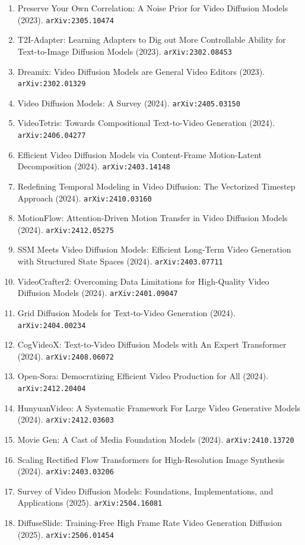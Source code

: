 \documentclass[11pt]{article}
\begin{document}
\begin{enumerate}
  \item Preserve Your Own Correlation: A Noise Prior for Video Diffusion Models (2023). \texttt{arXiv:2305.10474}
  \item T2I-Adapter: Learning Adapters to Dig out More Controllable Ability for
  Text-to-Image Diffusion Models (2023). \texttt{arXiv:2302.08453}
  \item Dreamix: Video Diffusion Models are General Video Editors (2023). \texttt{arXiv:2302.01329}
  \item Video Diffusion Models: A Survey (2024). \texttt{arXiv:2405.03150}
  \item VideoTetris: Towards Compositional Text-to-Video Generation (2024). \texttt{arXiv:2406.04277}
  \item Efficient Video Diffusion Models via Content-Frame Motion-Latent
  Decomposition (2024). \texttt{arXiv:2403.14148}
  \item Redefining Temporal Modeling in Video Diffusion: The Vectorized Timestep
  Approach (2024). \texttt{arXiv:2410.03160}
  \item MotionFlow: Attention-Driven Motion Transfer in Video Diffusion Models (2024). \texttt{arXiv:2412.05275}
  \item SSM Meets Video Diffusion Models: Efficient Long-Term Video Generation
  with Structured State Spaces (2024). \texttt{arXiv:2403.07711}
  \item VideoCrafter2: Overcoming Data Limitations for High-Quality Video
  Diffusion Models (2024). \texttt{arXiv:2401.09047}
  \item Grid Diffusion Models for Text-to-Video Generation (2024). \texttt{arXiv:2404.00234}
  \item CogVideoX: Text-to-Video Diffusion Models with An Expert Transformer (2024). \texttt{arXiv:2408.06072}
  \item Open-Sora: Democratizing Efficient Video Production for All (2024). \texttt{arXiv:2412.20404}
  \item HunyuanVideo: A Systematic Framework For Large Video Generative Models (2024). \texttt{arXiv:2412.03603}
  \item Movie Gen: A Cast of Media Foundation Models (2024). \texttt{arXiv:2410.13720}
  \item Scaling Rectified Flow Transformers for High-Resolution Image Synthesis (2024). \texttt{arXiv:2403.03206}
  \item Survey of Video Diffusion Models: Foundations, Implementations, and Applications (2025). \texttt{arXiv:2504.16081}
  \item DiffuseSlide: Training-Free High Frame Rate Video Generation Diffusion (2025). \texttt{arXiv:2506.01454}

\end{enumerate}
\end{document}
